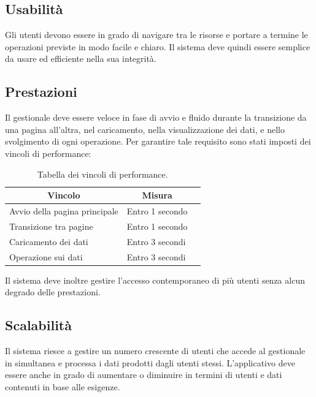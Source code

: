 \subsection{Usabilità}
Gli utenti devono essere in grado di navigare tra le risorse e portare a termine le operazioni previste in modo facile e chiaro. Il sistema deve quindi essere semplice da usare ed efficiente nella sua integrità. 

\subsection{Prestazioni}
Il gestionale deve essere veloce in fase di avvio e fluido durante la transizione da una pagina all'altra, nel caricamento, nella visualizzazione dei dati, e nello svolgimento di ogni operazione.
Per garantire tale requisito sono stati imposti dei vincoli di performance:
\begin{table}[h!]
\centering
\begin{tabular}{|l|l|l|}
\hline
\multicolumn{1}{|c|}{\textbf{Vincolo}} & \multicolumn{1}{c|}{\textbf{Misura}} \\ \hline
Avvio della pagina principale &  Entro 1 secondo\\ \hline
Transizione tra pagine & Entro 1 secondo\\ \hline
Caricamento dei dati & Entro 3 secondi\\ \hline
Operazione sui dati & Entro 3 secondi\\ \hline
\end{tabular}
\caption{Tabella dei vincoli di performance.}
\label{}
\end{table}
\noindent
\newline
Il sistema deve inoltre gestire l'accesso contemporaneo di più utenti senza alcun degrado delle prestazioni.

\subsection{Scalabilità}
Il sistema riesce a gestire un numero crescente di utenti che accede al gestionale in simultanea e processa i dati prodotti dagli utenti stessi.     
L'applicativo deve essere anche in grado di aumentare o diminuire in termini di utenti e dati contenuti in base alle esigenze.

